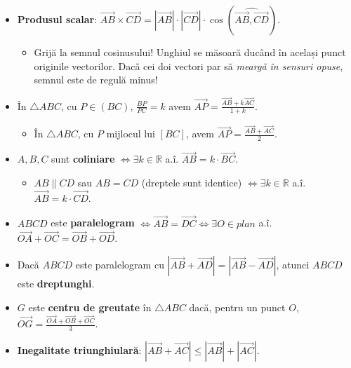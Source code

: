 \documentclass{article}
\begin{document}
\begin{itemize}
    \item \textbf{Produsul scalar}: $\overrightarrow{AB}\times\overrightarrow{CD} = |\overrightarrow{AB}|\cdot|\overrightarrow{CD}|\cdot\cos(\widehat{\overrightarrow{AB}, \overrightarrow{CD}})$.
    \begin{itemize}
        \item Grijă la semnul cosinusului! Unghiul se măsoară ducând în același punct originile vectorilor. Dacă cei doi vectori par să \textit{meargă în sensuri opuse}, semnul este de regulă minus!
    \end{itemize}
    \item În $\triangle ABC$, cu $P \in (BC)$, $\frac{BP}{PC} = k$ avem $\overrightarrow{AP}=\frac{\overrightarrow{AB}+k\overrightarrow{AC}}{1+k}$.
    \begin{itemize}
        \item În $\triangle ABC$, cu $P$ mijlocul lui $[BC]$, avem $\overrightarrow{AP}=\frac{\overrightarrow{AB}+\overrightarrow{AC}}{2}$.
    \end{itemize}
    \item $A, B, C$ sunt \textbf{coliniare} $\iff \exists k \in \mathbb{R}$ a.î. $\overrightarrow{AB} = k \cdot \overrightarrow{BC}$.
    \begin{itemize}
        \item $AB \parallel CD$ sau $AB = CD$ (dreptele sunt identice) $\iff \exists k \in \mathbb{R}$ a.î. $\overrightarrow{AB} = k \cdot \overrightarrow{CD}$.
    \end{itemize}
    \item $ABCD$ este \textbf{paralelogram} $\iff \overrightarrow{AB}=\overrightarrow{DC} \iff \exists O \in \textit{plan}$ a.î. $\overrightarrow{OA}+\overrightarrow{OC}=\overrightarrow{OB}+\overrightarrow{OD}$.
    \item Dacă $ABCD$ este paralelogram cu $|\overrightarrow{AB}+\overrightarrow{AD}|=|\overrightarrow{AB}-\overrightarrow{AD}|$, atunci $ABCD$ este \textbf{dreptunghi}.
    \item $G$ este \textbf{centru de greutate} în $\triangle ABC$ dacă, pentru un punct $O$,\quad  $\overrightarrow{OG}=\frac{\overrightarrow{OA}+\overrightarrow{OB}+\overrightarrow{OC}}{3}$.
    \item \textbf{Inegalitate triunghiulară}: $|\overrightarrow{AB}+\overrightarrow{AC}| \leq |\overrightarrow{AB}|+|\overrightarrow{AC}|$.
\end{itemize}
\end{document}
